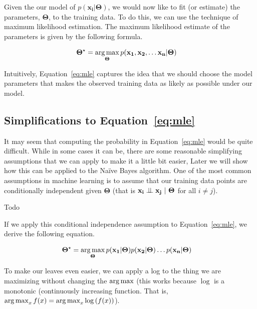 \documentclass[assignment03_Solutions]{subfiles}
\begin{document}
Given the our model of $p(\mathbf{x_i}|\mathbf{\Theta})$, we would now like to fit (or estimate) the parameters, $\mathbf{\Theta}$, to the training data.  To do this, we can use the technique of maximum likelihood estimation.  The maximum likelihood estimate of the parameters is given by the following formula.

\begin{align}
\mathbf{\Theta^\star} &= \operatorname*{arg\,max}_{\mathbf{\Theta}} p(\mathbf{x_1}, \mathbf{x_2}, \ldots \mathbf{x_n} | \mathbf{\Theta}) \label{eq:mle}
\end{align}

Intuitively, Equation~\ref{eq:mle} captures the idea that we should choose the model parameters that makes the observed training data as likely as possible under our model.

\subsection{Simplifications to Equation~\ref{eq:mle}}

It may seem that computing the probability in Equation~\ref{eq:mle} would be quite difficult.   While in some cases it can be, there are some reasonable simplifying assumptions that we can apply to make it a little bit easier,  Later we will show how this can be applied to the Na\"ive Bayes algorithm.  One of the most common assumptions in machine learning is to assume that our training data points are conditionally independent given $\mathbf{\Theta}$ (that is $\mathbf{x_i} \perp\!\!\!\perp \mathbf{x_j}~|~\mathbf{\Theta}$ for all $i \neq j$).

\begin{understandingcheck}
Todo
\end{understandingcheck}

If we apply this conditional independence assumption to Equation~\ref{eq:mle}, we derive the following equation.

\begin{align}
\mathbf{\Theta^\star} &= \operatorname*{arg\,max}_{\mathbf{\Theta}} p(\mathbf{x_1} |  \mathbf{\Theta}) p(\mathbf{x_2} | \mathbf{\Theta}) \ldots p(\mathbf{x_n} | \mathbf{\Theta}) \label{eq:mleiid}
\end{align}

To make our leaves even easier, we can apply a log to the thing we are maximizing without changing the $\operatorname*{arg\,max}$ (this works because $\log$ is a monotonic (continuously increasing function.  That is, $\operatorname*{arg\,max}_x f(x) = \operatorname*{arg\,max}_x \log \left ( f(x) \right)$).
\end{document}
